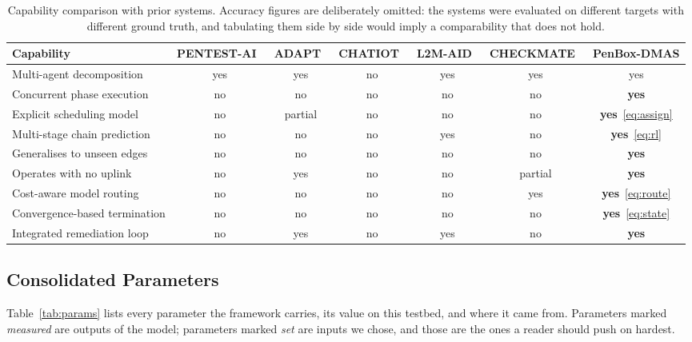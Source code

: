 \documentclass[journal]{IEEEtran}
\begin{document}
\begin{table}[!t]
  \caption{Capability comparison with prior systems. Accuracy figures are
           deliberately omitted: the systems were evaluated on different
           targets with different ground truth, and tabulating them side by
           side would imply a comparability that does not hold.}
  \label{tab:compare}
  \centering
  \footnotesize
  \begin{tabular}{@{}lcccccc@{}}
    \toprule
    \textbf{Capability}
      & \textbf{PENTEST-AI}~\cite{bianou2024}
      & \textbf{ADAPT}~\cite{skandylas2025}
      & \textbf{CHATIOT}~\cite{dong2025}
      & \textbf{L2M-AID}~\cite{xu2025}
      & \textbf{CHECKMATE}~\cite{deng2024checkmate}
      & \textbf{PenBox-DMAS} \\
    \midrule
    Multi-agent decomposition        & yes & yes & no  & yes & yes & yes \\
    Concurrent phase execution       & no  & no  & no  & no  & no  & \textbf{yes} \\
    Explicit scheduling model        & no  & partial & no & no & no & \textbf{yes}~\eqref{eq:assign} \\
    Multi-stage chain prediction     & no  & no  & no  & yes & no  & \textbf{yes}~\eqref{eq:rl} \\
    Generalises to unseen edges      & no  & no  & no  & no  & no  & \textbf{yes} \\
    Operates with no uplink          & no  & yes & no  & no  & partial & \textbf{yes} \\
    Cost-aware model routing         & no  & no  & no  & no  & yes & \textbf{yes}~\eqref{eq:route} \\
    Convergence-based termination    & no  & no  & no  & no  & no  & \textbf{yes}~\eqref{eq:state} \\
    Integrated remediation loop      & no  & yes & no  & yes & no  & \textbf{yes} \\
    \bottomrule
  \end{tabular}
\end{table}

\subsection{Consolidated Parameters}

Table~\ref{tab:params} lists every parameter the framework carries, its value
on this testbed, and where it came from. Parameters marked \emph{measured} are
outputs of the model; parameters marked \emph{set} are inputs we chose, and
those are the ones a reader should push on hardest.
\end{document}
